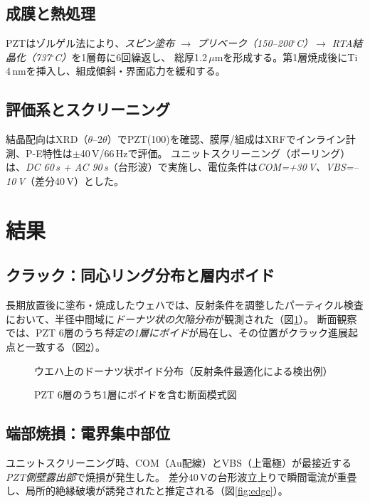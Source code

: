 \documentclass[11pt,a4paper]{ltjsarticle} %
\begin{document}
\subsection{成膜と熱処理}
PZTはゾルゲル法により、\emph{スピン塗布 $\rightarrow$ プリベーク（150--200$^\circ$C）$\rightarrow$ RTA結晶化（737$^\circ$C）}を1層毎に6回繰返し、
総厚1.2\,$\mu$mを形成する。第1層焼成後にTi 4\,nmを挿入し、組成傾斜・界面応力を緩和する。

\subsection{評価系とスクリーニング}
結晶配向はXRD（$\theta$–2$\theta$）でPZT(100)を確認、膜厚/組成はXRFでインライン計測、P-E特性は$\pm$40\,V/66\,Hzで評価。
ユニットスクリーニング（ポーリング）は、\emph{DC 60\,s + AC 90\,s}（台形波）で実施し、電位条件は\emph{COM=+30\,V、VBS=--10\,V}（差分40\,V）とした。

\section{結果}
\subsection{クラック：同心リング分布と層内ボイド}
長期放置後に塗布・焼成したウェハでは、反射条件を調整したパーティクル検査において、半径中間域に\emph{ドーナツ状の欠陥分布}が観測された（図\ref{fig:donut}）。
断面観察では、PZT 6層のうち\emph{特定の1層にボイド}が局在し、その位置がクラック進展起点と一致する（図\ref{fig:layer-void}）。

\begin{figure}[h]
  \centering
  
  \caption{ウエハ上のドーナツ状ボイド分布（反射条件最適化による検出例）}
  \label{fig:donut}
\end{figure}

\begin{figure}[h]
  \centering
  
  \caption{PZT 6層のうち1層にボイドを含む断面模式図}
  \label{fig:layer-void}
\end{figure}

\subsection{端部焼損：電界集中部位}
ユニットスクリーニング時、COM（Au配線）とVBS（上電極）が最接近する\emph{PZT側壁露出部}で焼損が発生した。
差分40\,Vの台形波立上りで瞬間電流が重畳し、局所的絶縁破壊が誘発されたと推定される（図\ref{fig:edge}）。
\end{document}
